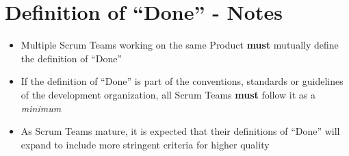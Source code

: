 \documentclass[a4paper,11pt,twocolumn]{article}
\begin{document}
\section*{Definition of ``Done'' - Notes}
\begin{itemize}
    \item Multiple Scrum Teams working on the same Product \textbf{must} mutually define the definition of ``Done''
    \item If the definition of ``Done'' is part of the conventions, standards or guidelines of the development organization, all Scrum Teams \textbf{must} follow it as a \textit{minimum}
	\item As Scrum Teams mature, it is expected that their definitions of ``Done'' will expand to include more stringent criteria for higher quality
\end{itemize}

\nocite{*}


\end{document}
